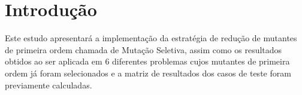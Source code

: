 \section{Introdução}
\label{section:introduction}
Este estudo apresentará a implementação da estratégia de redução de mutantes
de primeira ordem chamada de Mutação Seletiva, assim como os resultados obtidos
ao ser aplicada em 6 diferentes problemas cujos mutantes de primeira ordem
já foram selecionados e a matriz de resultados dos casos de teste foram 
previamente calculadas.